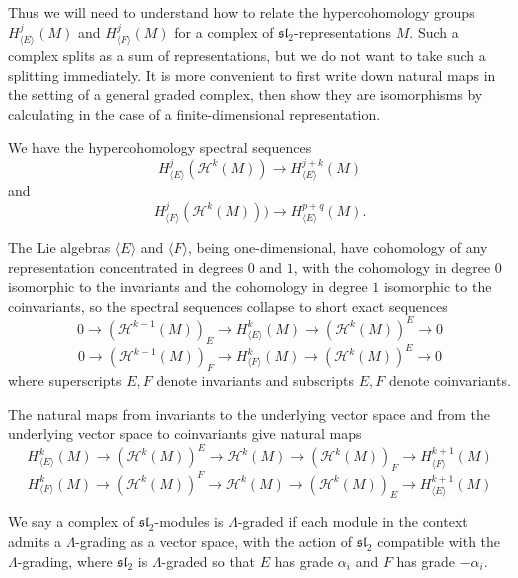 \documentclass[11pt,letterpaper]{article}
\theoremstyle{definition}
\theoremstyle{remark}
\numberwithin{equation}{section}
\theoremstyle{dotless}
\newcommand{\LieH}{H}
\begin{document}
Thus we will need to understand how to relate  the hypercohomology groups $\LieH^j_{\langle E \rangle} (M) $ and $\LieH^j_{ \langle F \rangle}  ( M )$ for a complex of $\mathfrak{sl}_2$-representations $M$. Such a complex splits as a sum of representations, but we do not want to take such a splitting immediately. It is more convenient to first write down natural maps in the setting of a general graded complex, then show they are isomorphisms by calculating in the case of a  finite-dimensional representation.

We have the hypercohomology spectral sequences
\[  \LieH^j_{\langle E \rangle} (   \mathcal H^k( M) ) \to \LieH^{j+k}_{\langle E \rangle} ( M)  \]
and
\[  \LieH^j_{\langle F \rangle} (  \mathcal H^k(M)) ) \to \LieH^{p+q}_{\langle E \rangle} ( M)  .\]

The Lie algebras $\langle E \rangle $ and $\langle F \rangle$, being one-dimensional, have cohomology of any representation concentrated in degrees $0$ and $1$, with the cohomology in degree $0$ isomorphic to the invariants and the cohomology in degree $1$ isomorphic to the coinvariants, so the spectral sequences collapse to short exact sequences
\[ 0 \to ( \mathcal H^{k-1} (M)  )_E \to   \LieH^{k}_{\langle E \rangle} ( M) \to   ( \mathcal H^{k} (M)  )^E \to 0 \]
\[ 0 \to ( \mathcal H^{k-1} (M)  )_F \to   \LieH^{k}_{\langle F \rangle} ( M) \to   ( \mathcal H^{k} (M)  )^E \to 0 \]
where superscripts $E,F$ denote invariants and subscripts $E,F$ denote coinvariants.



The natural maps from invariants to the underlying vector space and from the underlying vector space to coinvariants give natural maps
\begin{equation}\label{first-composition}  \LieH^{k}_{\langle E \rangle} ( M) \to   ( \mathcal H^{k} (M)  )^E \to \mathcal H^k(M) \to  ( \mathcal H^{k} (M)  )_F \to   \LieH^{k+1}_{\langle F \rangle} ( M) \end{equation}
\begin{equation}\label{second-composition}  \LieH^{k}_{\langle F \rangle} ( M) \to   ( \mathcal H^{k} (M)  )^F \to \mathcal H^k(M) \to  ( \mathcal H^{k} (M)  )_E \to   \LieH^{k+1}_{\langle E \rangle} ( M)\end{equation}


We say a complex of $\mathfrak{sl}_2$-modules is $\Lambda$-graded if each module in the context admits a $\Lambda$-grading as a vector space, with the action of $\mathfrak {sl}_2$ compatible with the $\Lambda$-grading, where  $\mathfrak{sl}_2$ is $\Lambda$-graded so that $E$ has grade $\alpha_i$ and $F$ has grade $-\alpha_i$.
\end{document}
